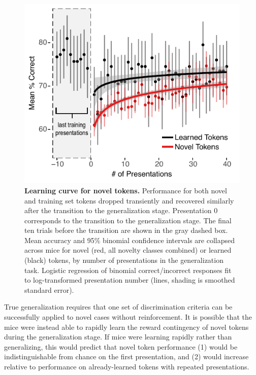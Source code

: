 \begin{figure}
\includegraphics[width=\linewidth]{speech/figures/Figure3.pdf}
\caption{\textbf{Learning curve for novel tokens.} Performance for both novel and training set tokens dropped transiently and recovered similarly after the transition to the generalization stage. Presentation 0 corresponds to the transition to the generalization stage. The final ten trials before the transition are shown in the gray dashed box. Mean accuracy and 95\% binomial confidence intervals are collapsed across mice for novel (red, all novelty classes combined) or learned (black) tokens, by number of presentations in the generalization task. Logistic regression of binomial correct/incorrect responses fit to log-transformed presentation number (lines, shading is smoothed standard error).}
\label{lc}
\end{figure}

True generalization requires that one set of discrimination criteria can be successfully applied to novel cases without reinforcement. It is possible that the mice were instead able to rapidly learn the reward contingency of novel tokens during the generalization stage. If mice were learning rapidly rather than generalizing, this would predict that novel token performance (1) would be indistinguishable from chance on the first presentation, and (2) would increase relative to performance on already-learned tokens with repeated presentations.

